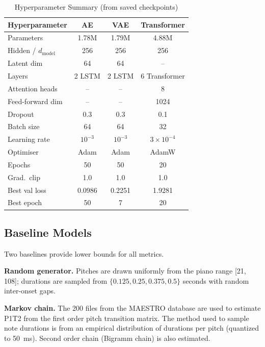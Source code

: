 \documentclass[conference]{IEEEtran}
\begin{document}
\begin{table}[t]
\caption{Hyperparameter Summary (from saved checkpoints)}
\label{tab:hparams}
\begin{center}
\begin{tabular}{l c c c}
\toprule
\textbf{Hyperparameter} & \textbf{AE} & \textbf{VAE} & \textbf{Transformer} \\
\midrule
Parameters       & 1.78M  & 1.79M  & 4.88M \\
Hidden / $d_\text{model}$ & 256 & 256 & 256 \\
Latent dim       & 64     & 64     & --    \\
Layers           & 2 LSTM & 2 LSTM & 6 Transformer \\
Attention heads  & --     & --     & 8     \\
Feed-forward dim & --     & --     & 1024  \\
Dropout          & 0.3    & 0.3    & 0.1   \\
Batch size       & 64     & 64     & 32    \\
Learning rate    & $10^{-3}$ & $10^{-3}$ & $3\times10^{-4}$ \\
Optimiser        & Adam   & Adam   & AdamW \\
Epochs           & 50     & 50     & 20    \\
Grad.\ clip      & 1.0    & 1.0    & 1.0   \\
Best val loss    & 0.0986 & 0.2251 & 1.9281 \\
Best epoch       & 50     & 7      & 20    \\
\bottomrule
\end{tabular}
\end{center}
\end{table}

\subsection{Baseline Models}

Two baselines provide lower bounds for all metrics.

\textbf{Random generator.} Pitches are drawn uniformly from the piano range [21, 108]; durations are sampled from $\{0.125, 0.25, 0.375, 0.5\}$ seconds with random inter-onset gaps.

\textbf{Markov chain.} The 200 files from the MAESTRO database are used to estimate P1T2 from the first order pitch transition matrix. The method used to sample note durations is from an empirical distribution of durations per pitch (quantized to 50~ms). Second order chain (Bigramm chain) is also estimated.
\end{document}
